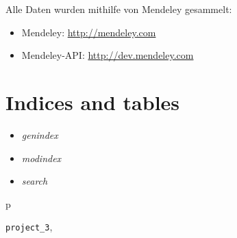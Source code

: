 \documentclass[letterpaper,10pt,english]{sphinxmanual}
\begin{document}
Alle Daten wurden mithilfe von Mendeley gesammelt:
\begin{itemize}
\item {} 
Mendeley: \href{http://mendeley.com/}{http://mendeley.com}

\item {} 
Mendeley-API: \href{http://dev.mendeley.com/}{http://dev.mendeley.com}

\end{itemize}


\chapter{Indices and tables}
\label{index:indices-and-tables}\begin{itemize}
\item {} 
\emph{genindex}

\item {} 
\emph{modindex}

\item {} 
\emph{search}

\end{itemize}


\renewcommand{\indexname}{Python Module Index}
\begin{theindex}
\def\bigletter#1{{\Large\sffamily#1}\nopagebreak\vspace{1mm}}
\bigletter{p}
\item {\texttt{project\_3}}, \pageref{project_3:module-project_3}
\end{theindex}

\renewcommand{\indexname}{Index}
\printindex
\end{document}
